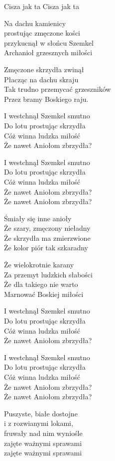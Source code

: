 {Cisza jak ta}
{Cisza jak ta}
\begin{text}
    \hfill\break
Na dachu kamienicy\\
prostując zmęczone kości\\
przykucnął w słońcu Szemkel\\
Archanioł grzesznych miłości

Zmęczone skrzydła zwinął\\
Płacząc na dachu skraju\\
Tak trudno przemycać grzeszników\\
Przez bramy Boskiego raju.

\vin I westchnął Szemkel smutno\\
\vin Do lotu prostując skrzydła\\
\vin Cóż winna ludzka miłość\\
\vin Że nawet Aniołom zbrzydła?

\vin I westchnął Szemkel smutno\\
\vin Do lotu prostując skrzydła\\
\vin Cóż winna ludzka miłość\\
\vin Że nawet Aniołom zbrzydła?\\
\vin Że nawet Aniołom zbrzydła?

    \hfill\break
Śmiały się inne anioły\\
Że szary, zmęczony nieładny\\
Że skrzydła ma zmierzwione\\
Że kolor piór tak szkaradny

Że wielokrotnie karany\\
Za przemyt ludzkich słabości\\
Że dla takiego nie warto\\
Marnować Boskiej miłości

\vin I westchnął Szemkel smutno\\
\vin Do lotu prostując skrzydła\\
\vin Cóż winna ludzka miłość\\
\vin Że nawet Aniołom zbrzydła?

\vin I westchnął Szemkel smutno\\
\vin Do lotu prostując skrzydła\\
\vin Cóż winna ludzka miłość\\
\vin Że nawet Aniołom zbrzydła?\\
\vin Że nawet Aniołom zbrzydła?

Puszyste, białe dostojne\\
i z rozwianymi lokami,\\
fruwały nad nim wyniośle\\
zajęte ważnymi sprawami\\
zajęte ważnymi sprawami


\end{text}
